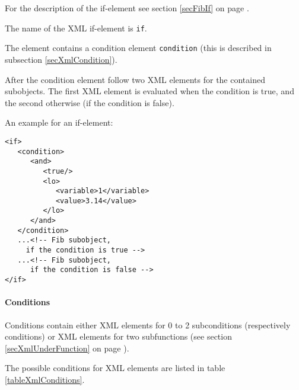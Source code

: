 For the description of the if-element see section \ref{secFibIf} on page \pageref{secFibIf} .

The name of the XML if-element is \verb|if|.

The element contains a condition element \verb|condition| (this is described in subsection \ref{secXmlCondition}).

After the condition element follow two XML elements for the contained subobjects. The first XML element is evaluated when the condition is true, and the second otherwise (if the condition is false).

\bigskip\noindent
An example for an if-element:
\begin{verbatim}
<if>
   <condition>
      <and>
         <true/>
         <lo>
            <variable>1</variable>
            <value>3.14</value>
         </lo>
      </and>
   </condition>
   ...<!-- Fib subobject,
     if the condition is true -->
   ...<!-- Fib subobject,
      if the condition is false -->
</if>
\end{verbatim}


\paragraph{Conditions}
\label{secXmlCondition}

Conditions contain either XML elements for 0 to 2 subconditions (respectively conditions) or XML elements for two subfunctions (see section \ref{secXmlUnderFunction} on page \pageref{secXmlUnderFunction}).

The possible conditions for XML elements are listed in table \ref{tableXmlConditions}.


